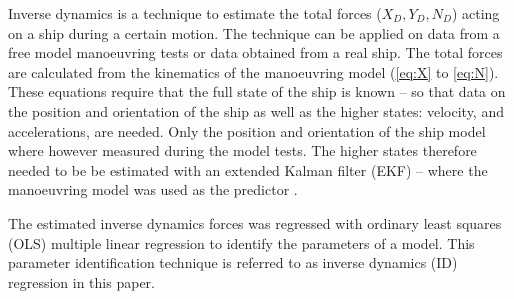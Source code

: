 Inverse dynamics is a technique to estimate the total forces ($X_D,Y_D,N_D$) acting on a ship during a certain motion. The technique can be applied on data from a free model manoeuvring tests or data obtained from a real ship. The total forces are calculated from the kinematics of the manoeuvring model (\autoref{eq:X} to \autoref{eq:N}). These equations require that the full state of the ship is known -- so that data on the position and orientation of the ship as well as the higher states: velocity, and accelerations, are needed.
Only the position and orientation of the ship model where however measured during the model tests.
The higher states therefore needed to be be estimated with an extended Kalman filter (EKF) -- where the manoeuvring model was used as the predictor \citep{alexandersson_wpcc_2022}.

The estimated inverse dynamics forces was regressed with ordinary least squares (OLS) multiple
linear regression to identify the parameters of a model. This parameter identification technique is referred to as inverse dynamics (ID) regression in this paper.